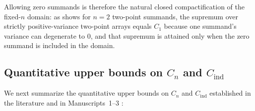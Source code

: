 \documentclass[11pt]{article}
\numberwithin{equation}{section}
\theoremstyle{definition}
\theoremstyle{remark}
\newcommand{\Cind}{C_{\mathrm{ind}}}
\begin{document}
Allowing zero summands is therefore the natural closed compactification of the
fixed-$n$ domain: as \citet[Theorem~1.2]{BellBernoulli2026} shows for $n=2$
two-point summands, the supremum over strictly positive-variance two-point
arrays equals $C_1$ because one summand's variance can degenerate to $0$, and
that supremum is attained only when the zero summand is included in the
domain.

\subsection{Quantitative upper bounds on $C_n$ and $\Cind$}\label{subsec:value-bounds}

We next summarize the quantitative upper bounds on $C_n$ and $\Cind$
established in the literature and in Manuscripts~1--3
\citep{BellIndependent2026,BellFinite2026,BellSmall2026}:
\end{document}
